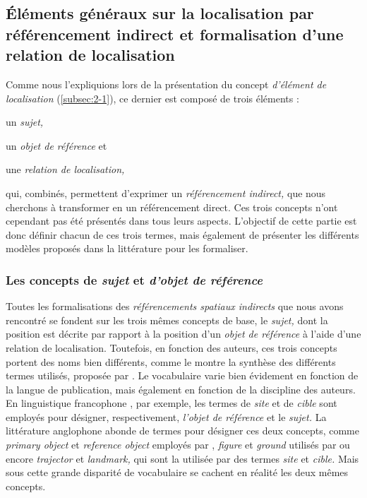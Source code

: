 
\subsection{Éléments généraux sur la localisation par référencement
  indirect et formalisation d'une relation de localisation}

Comme nous l'expliquions lors de la présentation du concept
\emph{d'élément de localisation} (\autoref{subsec:2-1}), ce dernier
est composé de trois éléments :
%
\begin{enumerate*}[label=(\alph*)]
\item \label{i:site} un \emph{sujet,}
\item \label{i:cible} un \emph{objet de référence} et
\item une \emph{relation de localisation,}
\end{enumerate*}
%
qui, combinés, permettent d'exprimer un \emph{référencement indirect,}
que nous cherchons à transformer en un référencement direct. Ces trois
concepts n'ont cependant pas été présentés dans tous leurs
aspects. L'objectif de cette partie est donc définir chacun de ces
trois termes, mais également de présenter les différents modèles
proposés dans la littérature pour les formaliser.

\subsubsection{Les concepts de \emph{sujet} et \emph{d'objet de
    référence}}

Toutes les formalisations des \emph{référencements spatiaux indirects}
que nous avons rencontré se fondent sur les trois mêmes concepts de
base, le \emph{sujet,} dont la position est décrite par rapport à la
position d'un \emph{objet de référence} à l'aide d'une relation de
localisation. Toutefois, en fonction des auteurs, ces trois concepts
portent des noms bien différents, comme le montre la synthèse des
différents termes utilisés, proposée par
\textcite{RetzSchmidt1988}. Le vocabulaire varie bien évidement en
fonction de la langue de publication, mais également en fonction de la
discipline des auteurs. En linguistique francophone
\autocite{Vandeloise1986,Borillo1998, Aurnague1997, Mathet2000}, par
exemple, les termes de \emph{site} et de \emph{cible} sont employés
pour désigner, respectivement, \emph{l'objet de référence} et le
\emph{sujet.}
%
La littérature anglophone abonde de termes pour désigner ces deux
concepts, comme \emph{primary object} et \emph{reference object}
employés par \textcite{RetzSchmidt1988, Clementini2013}, \emph{figure}
et \emph{ground} utilisés par \textcite{Talmy1983} ou encore
\emph{trajector} et \emph{landmark,} qui sont la utilisée par
\textcite{Vandeloise1984} des termes \emph{site} et \emph{cible.}
%
Mais sous cette grande disparité de vocabulaire se cachent en réalité
les deux mêmes concepts.

